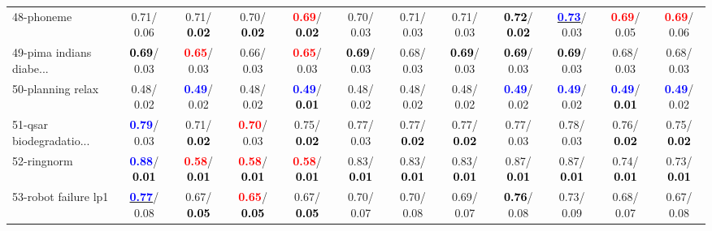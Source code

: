 \begin{table}[h]
\begin{center}
{\begin{tabular}{lc|c|c|c|c|c|c|c|c|c|c}
48-phoneme &   0.71/  0.06 &   0.71/\textcolor{black}{\textbf{  0.02}} &   0.70/\textcolor{black}{\textbf{  0.02}} & \textcolor{red}{\textbf{  0.69}}/\textcolor{black}{\textbf{  0.02}} &   0.70/  0.03 &   0.71/  0.03 &   0.71/  0.03 & \textcolor{black}{\textbf{  0.72}}/\textcolor{black}{\textbf{  0.02}} & \underline{\textcolor{blue}{\textbf{  0.73}}}/  0.03 & \textcolor{red}{\textbf{  0.69}}/  0.05 & \textcolor{red}{\textbf{  0.69}}/  0.06 \\
49-pima indians diabe... & \textcolor{black}{\textbf{  0.69}}/  0.03 & \textcolor{red}{\textbf{  0.65}}/  0.03 &   0.66/  0.03 & \textcolor{red}{\textbf{  0.65}}/  0.03 & \textcolor{black}{\textbf{  0.69}}/  0.03 &   0.68/  0.03 & \textcolor{black}{\textbf{  0.69}}/  0.03 & \textcolor{black}{\textbf{  0.69}}/  0.03 & \textcolor{black}{\textbf{  0.69}}/  0.03 &   0.68/  0.03 &   0.68/  0.03 \\
50-planning relax &   0.48/  0.02 & \textcolor{blue}{\textbf{  0.49}}/  0.02 &   0.48/  0.02 & \textcolor{blue}{\textbf{  0.49}}/\textcolor{black}{\textbf{  0.01}} &   0.48/  0.02 &   0.48/  0.02 &   0.48/  0.02 & \textcolor{blue}{\textbf{  0.49}}/  0.02 & \textcolor{blue}{\textbf{  0.49}}/  0.02 & \textcolor{blue}{\textbf{  0.49}}/\textcolor{black}{\textbf{  0.01}} & \textcolor{blue}{\textbf{  0.49}}/  0.02 \\
51-qsar biodegradatio... & \textcolor{blue}{\textbf{  0.79}}/  0.03 &   0.71/\textcolor{black}{\textbf{  0.02}} & \textcolor{red}{\textbf{  0.70}}/  0.03 &   0.75/\textcolor{black}{\textbf{  0.02}} &   0.77/  0.03 &   0.77/\textcolor{black}{\textbf{  0.02}} &   0.77/\textcolor{black}{\textbf{  0.02}} &   0.77/  0.03 &   0.78/  0.03 &   0.76/\textcolor{black}{\textbf{  0.02}} &   0.75/\textcolor{black}{\textbf{  0.02}} \\
52-ringnorm & \textcolor{blue}{\textbf{  0.88}}/\textcolor{black}{\textbf{  0.01}} & \textcolor{red}{\textbf{  0.58}}/\textcolor{black}{\textbf{  0.01}} & \textcolor{red}{\textbf{  0.58}}/\textcolor{black}{\textbf{  0.01}} & \textcolor{red}{\textbf{  0.58}}/\textcolor{black}{\textbf{  0.01}} &   0.83/\textcolor{black}{\textbf{  0.01}} &   0.83/\textcolor{black}{\textbf{  0.01}} &   0.83/\textcolor{black}{\textbf{  0.01}} &   0.87/\textcolor{black}{\textbf{  0.01}} &   0.87/\textcolor{black}{\textbf{  0.01}} &   0.74/\textcolor{black}{\textbf{  0.01}} &   0.73/\textcolor{black}{\textbf{  0.01}} \\
53-robot failure lp1 & \underline{\textcolor{blue}{\textbf{  0.77}}}/  0.08 &   0.67/\textcolor{black}{\textbf{  0.05}} & \textcolor{red}{\textbf{  0.65}}/\textcolor{black}{\textbf{  0.05}} &   0.67/\textcolor{black}{\textbf{  0.05}} &   0.70/  0.07 &   0.70/  0.08 &   0.69/  0.07 & \textcolor{black}{\textbf{  0.76}}/  0.08 &   0.73/  0.09 &   0.68/  0.07 &   0.67/  0.08 \\ \hline

\end{tabular}}
\end{center}
\end{table}
